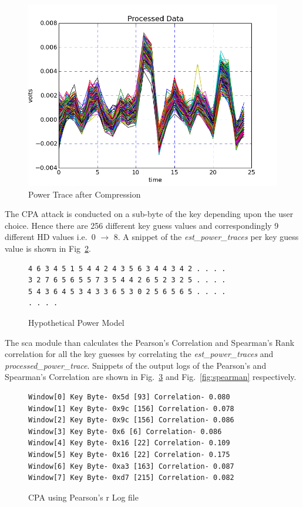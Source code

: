 \documentclass{llncs}
\numberwithin{algorithm}{chapter}
\begin{document}
\begin{figure}[h]
\begin{center}
\includegraphics[scale=0.8]{figures/scaTrace4}
\caption{\label{fig:ptcp}Power Trace after Compression}
\end{center} 
\vspace{-3ex}
\end{figure}

The CPA attack is conducted on a sub-byte of the key depending upon the user choice. Hence 
there are 256 different key guess values and correspondingly 9 different HD values i.e.\ 0 $\rightarrow$ 8.
A snippet of the \emph{est\_power\_traces} per key guess value is shown in Fig~\ref{fig:fobos-estpower}. 
\begin{figure}[ht]
\begin{Verbatim}[frame=single]
4 6 3 4 5 1 5 4 4 2 4 3 5 6 3 4 4 3 4 2 . . . .
3 2 7 6 5 6 5 5 7 3 5 4 4 2 6 5 2 3 2 5 . . . .
5 4 3 6 4 5 3 4 3 3 6 5 3 0 2 5 6 5 6 5 . . . .
. . . .
\end{Verbatim}
\caption{\label{fig:fobos-estpower}Hypothetical Power Model}
\end{figure}

The sca module than calculates the Pearson's Correlation and Spearman's Rank correlation
for all the key guesses by correlating 
the \emph{est\_power\_traces} and \emph{processed\_power\_trace}. 
Snippets of the output logs of the Pearson's and Spearman's Correlation are shown
in Fig.~\ref{fig:pearson} and Fig.~\ref{fig:spearman} respectively.

\begin{figure}[h]
\begin{Verbatim}[frame=single]
Window[0] Key Byte- 0x5d [93] Correlation- 0.080
Window[1] Key Byte- 0x9c [156] Correlation- 0.078
Window[2] Key Byte- 0x9c [156] Correlation- 0.086
Window[3] Key Byte- 0x6 [6] Correlation- 0.086
Window[4] Key Byte- 0x16 [22] Correlation- 0.109
Window[5] Key Byte- 0x16 [22] Correlation- 0.175
Window[6] Key Byte- 0xa3 [163] Correlation- 0.087
Window[7] Key Byte- 0xd7 [215] Correlation- 0.082
\end{Verbatim}
\caption{\label{fig:pearson}CPA using Pearson's r Log file}
\end{figure}
\end{document}
